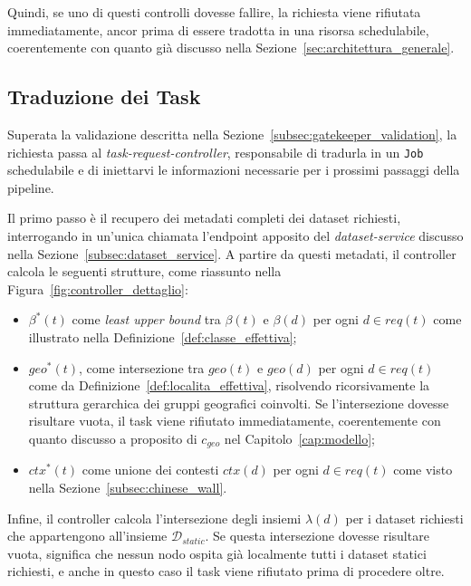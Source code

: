 Quindi, se uno di questi controlli dovesse fallire, la richiesta viene rifiutata immediatamente, ancor prima di essere tradotta in una risorsa schedulabile, coerentemente con quanto già discusso nella Sezione~\ref{sec:architettura_generale}.


\subsection{Traduzione dei Task}
\label{subsec:task_request_controller}

Superata la validazione descritta nella Sezione~\ref{subsec:gatekeeper_validation}, la richiesta passa al \emph{task-request-controller}, responsabile di tradurla in un \texttt{Job} schedulabile e di iniettarvi le informazioni necessarie per i prossimi passaggi della pipeline. 

Il primo passo è il recupero dei metadati completi dei dataset richiesti, interrogando in un'unica chiamata l'endpoint apposito del \emph{dataset-service} discusso nella Sezione~\ref{subsec:dataset_service}. A partire da questi metadati, il controller calcola le seguenti strutture, come riassunto nella Figura~\ref{fig:controller_dettaglio}:

\begin{itemize}
    \item $\beta^*(t)$ come \emph{least upper bound} tra $\beta(t)$ e $\beta(d)$ per ogni $d \in req(t)$ come illustrato nella Definizione~\ref{def:classe_effettiva};
    \item $geo^*(t)$, come intersezione tra $geo(t)$ e $geo(d)$ per ogni $d \in req(t)$ come da Definizione~\ref{def:localita_effettiva}, risolvendo ricorsivamente la struttura gerarchica dei gruppi geografici coinvolti. Se l'intersezione dovesse risultare vuota, il task viene rifiutato immediatamente, coerentemente con quanto discusso a proposito di $c_{geo}$ nel Capitolo~\ref{cap:modello};
    \item $ctx^*(t)$ come unione dei contesti $ctx(d)$ per ogni $d \in req(t)$ come visto nella Sezione~\ref{subsec:chinese_wall}.
\end{itemize}

Infine, il controller calcola l'intersezione degli insiemi $\lambda(d)$ per i dataset richiesti che appartengono all'insieme $\mathcal{D}_{static}$. Se questa intersezione dovesse risultare vuota, significa che nessun nodo ospita già localmente tutti i dataset statici richiesti, e anche in questo caso il task viene rifiutato prima di procedere oltre.

